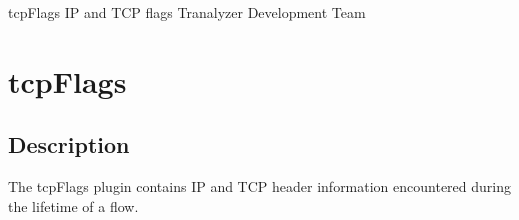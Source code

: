 \documentclass[documentation]{subfiles}
\begin{document}
\trantitle
    {tcpFlags}
    {IP and TCP flags}
    {Tranalyzer Development Team} %

\section{tcpFlags}\label{s:tcpFlags}

\subsection{Description}
The tcpFlags plugin contains IP and TCP header information encountered during the lifetime of a flow.

%
%
%
\end{document}
